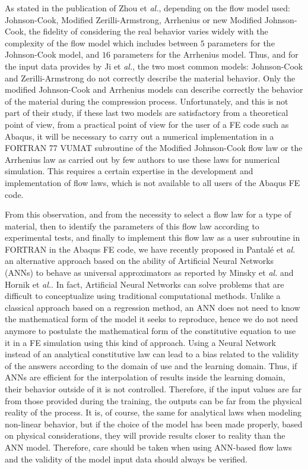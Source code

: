 \documentclass[algorithms,article,submit,pdftex,moreauthors]{Definitions/mdpi}
\makeatletter
\DeclareRobustCommand{\eal}{et \emph{al.}\@\xspace}
\makeatother
\begin{document}
As stated in the publication of Zhou \eal \cite{Zhou-2020}, depending on the flow model used: Johnson-Cook, Modified Zerilli-Armstrong, Arrhenius or new Modified Johnson-Cook, the fidelity of considering the real behavior varies widely with the complexity of the flow model which includes between $5$ parameters for the Johnson-Cook model, and $16$ parameters for the Arrhenius model.
Thus, and for the input data provides by Ji \eal \cite{Ji-2018}, the two most common models: Johnson-Cook and Zerilli-Armstrong do not correctly describe the material behavior.
Only the modified Johnson-Cook and Arrhenius models can describe correctly the behavior of the material during the compression process.
Unfortunately, and this is not part of their study, if these last two models are satisfactory from a theoretical point of view, from a practical point of view for the user of a FE code such as Abaqus, it will be necessary to carry out a numerical implementation in a FORTRAN 77 VUMAT subroutine of the Modified Johnson-Cook flow law or the Arrhenius law as carried out by few authors \cite{Liang-2022, Gao-2007-FRT, Ming-2018} to use these laws for numerical simulation.
This requires a certain expertise in the development and implementation of flow laws, which is not available to all users of the Abaqus FE code.

From this observation, and from the necessity to select a flow law for a type of material, then to identify the parameters of this flow law according to experimental tests, and finally to implement this flow law as a user subroutine in FORTRAN in the Abaqus FE code, we have recently proposed in Pantalé \eal \cite{Pantale-2021} an alternative approach based on the ability of Artificial Neural Networks (ANNs) to behave as universal approximators as reported by Minsky \eal \cite{Minsky-1969} and Hornik \eal \cite{Hornik-1989}.
In fact, Artificial Neural Networks can solve problems that are difficult to conceptualize using traditional computational methods.
Unlike a classical approach based on a regression method, an ANN does not need to know the mathematical form of the model it seeks to reproduce, hence we do not need anymore to postulate the mathematical form of the constitutive equation to use it in a FE simulation using this kind of approach.
Using a Neural Network instead of an analytical constitutive law can lead to a bias related to the validity of the answers according to the domain of use and the learning domain.
Thus, if ANNs are efficient for the interpolation of results inside the learning domain, their behavior outside of it is not controlled.
Therefore, if the input values are far from those provided during the training, the outputs can be far from the physical reality of the process.
It is, of course, the same for analytical laws when modeling non-linear behavior, but if the choice of the model has been made properly, based on physical considerations, they will provide results closer to reality than the ANN model.
Therefore, care should be taken when using ANN-based flow laws and the validity of the model input data should always be verified.
\end{document}
